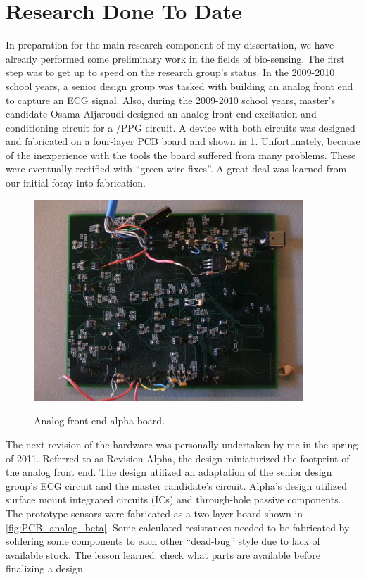 \section{Research Done To Date}
\label{sec:ResearchDoneToDate}
In preparation for the main research component of my dissertation, we have already performed some preliminary work in the fields of bio-sensing. The first step was to get up to speed on the research group's status. In the 2009-2010 school years, a senior design group was tasked with building an analog front end to capture an ECG signal. Also, during the 2009-2010 school years, master's candidate Osama Aljaroudi designed an analog front-end excitation and conditioning circuit for a /PPG circuit. A device with both circuits was designed and fabricated on a four-layer PCB board and shown in \cref{fig:PCB_alpha}. Unfortunately, because of the inexperience with the tools the board suffered from many problems. These were eventually rectified with “green wire fixes”. A great deal was learned from our initial foray into fabrication.

\begin{figure}
	\begin{center}
		\label{fig:PCB_alpha}
		\includegraphics[scale=1,width=0.9\textwidth]{Images/PCB_Alpha.jpg} 
		\caption{Analog front-end alpha board.}
	\end{center}
\end{figure}

The next revision of the hardware was personally undertaken by me in the spring of 2011. Referred to as Revision Alpha, the design miniaturized the footprint of the analog front end. The design utilized an adaptation of the senior design group's ECG circuit and the master candidate's  circuit. Alpha's design utilized surface mount integrated circuits (ICs) and through-hole passive components. The prototype sensors were fabricated as a two-layer board shown in \cref{fig:PCB_analog_beta}. Some calculated resistances needed to be fabricated by soldering some components to each other “dead-bug” style due to lack of available stock. The lesson learned: check what parts are available before finalizing a design.

